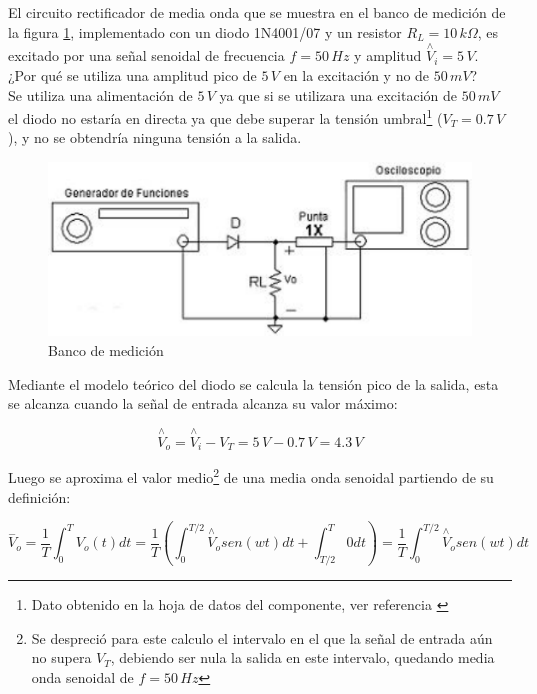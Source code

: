 \documentclass[10pt,spanish,a4paper,openany,notitlepage]{article}
\begin{document}
El circuito rectificador de media onda que se muestra en el banco de medición de la figura \ref{fig:rect_banco}, implementado con un diodo 1N4001/07 y un resistor $R_L = 10\,\unit{k\Omega}$, es excitado por una señal senoidal de frecuencia $f = 50\,\unit{Hz}$ y amplitud $\overset{\wedge}{V}_{i} = 5\,\unit{V}$.\\

{\color{OliveGreen}¿Por qué se utiliza una amplitud pico de $5\,\unit{V}$ en la excitación y no de $50\,\unit{mV}$?}\\

Se utiliza una alimentación de $5\,\unit{V}$ ya que si se utilizara una excitación de $50\,\unit{mV}$ el diodo no estaría en directa ya que debe superar la tensión umbral\footnote{Dato obtenido en la hoja de datos del componente, ver referencia \cite{Diodo 1N4001/07}} ($V_T = 0.7\,\unit{V}$), y no se obtendría ninguna tensión a la salida. 

\begin{figure}[H]
\centering
\includegraphics[scale=0.8]{circuitos/Fsincap.png}
\caption{Banco de medición}
\label{fig:rect_banco}
\end{figure}

Mediante el modelo teórico del diodo se calcula la tensión pico de la salida, esta se alcanza cuando la señal de entrada alcanza su valor máximo:

\[\displaystyle \overset{\wedge}{V}_{o} = \overset{\wedge}{V}_{i} - V_T = 5\,\unit{V} - 0.7\,\unit{V} = 4.3\,\unit{V} \]

Luego se aproxima el valor medio\footnote{Se despreció para este calculo el intervalo en el que la señal de entrada aún no supera $V_T$, debiendo ser nula la salida en este intervalo, quedando media onda senoidal de $f=50\,\unit{Hz}$} de una media onda senoidal partiendo de su definición:

\[ \displaystyle \overset{-}{V}_{o} = \frac{1}{T}\int_0^T V_o(t) dt = \frac{1}{T} \left( \int_0^{T/2} \overset{\wedge}{V}_{o} sen(w t) dt  + \int_{T/2}^{T} 0 dt \right) = \frac{1}{T} \int_0^{T/2} \overset{\wedge}{V}_{o} sen(w t) dt \]
\end{document}
